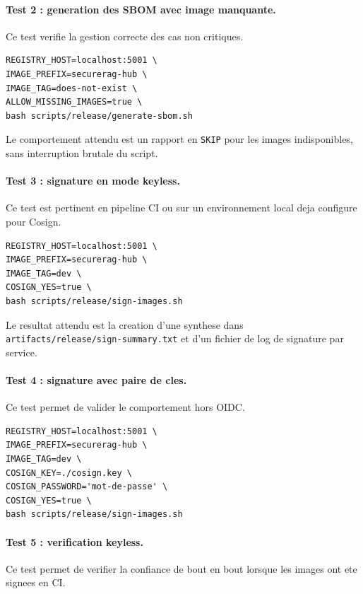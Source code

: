 \paragraph{Test 2 : generation des SBOM avec image manquante.}
Ce test verifie la gestion correcte des cas non critiques.

\begin{verbatim}
REGISTRY_HOST=localhost:5001 \
IMAGE_PREFIX=securerag-hub \
IMAGE_TAG=does-not-exist \
ALLOW_MISSING_IMAGES=true \
bash scripts/release/generate-sbom.sh
\end{verbatim}

Le comportement attendu est un rapport en \texttt{SKIP} pour les images indisponibles, sans interruption brutale du script.

\paragraph{Test 3 : signature en mode keyless.}
Ce test est pertinent en pipeline CI ou sur un environnement local deja configure pour Cosign.

\begin{verbatim}
REGISTRY_HOST=localhost:5001 \
IMAGE_PREFIX=securerag-hub \
IMAGE_TAG=dev \
COSIGN_YES=true \
bash scripts/release/sign-images.sh
\end{verbatim}

Le resultat attendu est la creation d'une synthese dans \texttt{artifacts/release/sign-summary.txt} et d'un fichier de log de signature par service.

\paragraph{Test 4 : signature avec paire de cles.}
Ce test permet de valider le comportement hors OIDC.

\begin{verbatim}
REGISTRY_HOST=localhost:5001 \
IMAGE_PREFIX=securerag-hub \
IMAGE_TAG=dev \
COSIGN_KEY=./cosign.key \
COSIGN_PASSWORD='mot-de-passe' \
COSIGN_YES=true \
bash scripts/release/sign-images.sh
\end{verbatim}

\paragraph{Test 5 : verification keyless.}
Ce test permet de verifier la confiance de bout en bout lorsque les images ont ete signees en CI.

